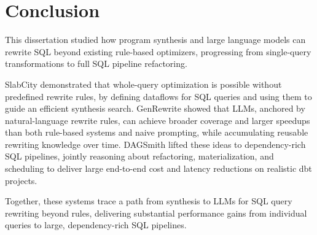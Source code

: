 \chapter{Conclusion}
\label{chap:conclusion}

This dissertation studied how program synthesis and large language
models can rewrite SQL beyond existing rule-based optimizers,
progressing from single-query transformations to full SQL pipeline
refactoring.

SlabCity demonstrated that whole-query optimization is possible
without predefined rewrite rules, by defining dataflows for SQL
queries and using them to guide an efficient synthesis search.
GenRewrite showed that LLMs, anchored by natural-language rewrite
rules, can achieve broader coverage and larger speedups than both
rule-based systems and naive prompting, while accumulating reusable
rewriting knowledge over time. DAGSmith lifted these ideas to
dependency-rich SQL pipelines, jointly reasoning about refactoring,
materialization, and scheduling to deliver large end-to-end cost and
latency reductions on realistic dbt projects.

Together, these systems trace a path from synthesis to LLMs for SQL
query rewriting beyond rules, delivering substantial performance gains
from individual queries to large, dependency-rich SQL pipelines.
